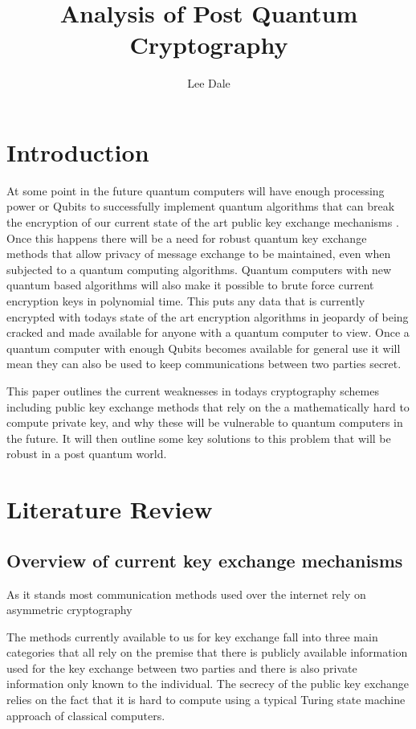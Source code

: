 \documentclass{article}
\title{Analysis of Post Quantum Cryptography}
\author{Lee Dale}
\begin{document}
\maketitle

\section{Introduction}

At some point in the future quantum computers will have enough processing power or Qubits to successfully implement quantum algorithms that can break the encryption of our current state of the art public key exchange mechanisms \cite{Bellizia2021Post-QuantumDesign}. Once this happens there will be a need for robust quantum key exchange methods that allow privacy of message exchange to be maintained, even when subjected to a quantum computing algorithms. Quantum computers with new quantum based algorithms will also make it possible to brute force current encryption keys in polynomial time. This puts any data that is currently encrypted with todays state of the art encryption algorithms in jeopardy of being cracked and made available for anyone with a quantum computer to view. Once a quantum computer with enough Qubits becomes available for general use it will mean they can also be used to keep communications between two parties secret.

This paper outlines the current weaknesses in todays cryptography schemes including public key exchange methods that rely on the a mathematically hard to compute private key, and why these will be vulnerable to quantum computers in the future. It will then outline some key solutions to this problem that will be robust in a post quantum world. 

\section{Literature Review}

\subsection{Overview of current key exchange mechanisms}
As it stands most communication methods used over the internet rely on asymmetric cryptography

The methods currently available to us for key exchange fall into three main categories that all rely on the premise that there is publicly available information used for the key exchange between two parties and there is also private information only known to the individual. The secrecy of the public key exchange relies on the fact  that it is hard to compute using a typical Turing state machine approach of classical computers. 
\end{document}
